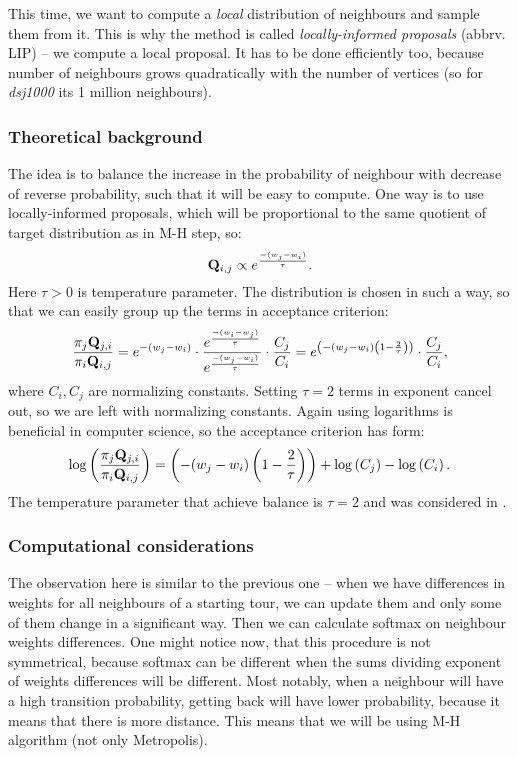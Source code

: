 	This time, we want to compute a \textit{local} distribution of neighbours and sample them from it. This is why the method is called \textit{locally-informed proposals} (abbrv. LIP) -- we compute a local proposal. It has to be done efficiently too, because number of neighbours grows quadratically with the number of vertices (so for \textit{dsj1000} its 1 million neighbours).
	
	\subsubsection{Theoretical background}
		The idea is to balance the increase in the probability of neighbour with decrease of reverse probability, such that it will be easy to compute. One way is to use locally-informed proposals, which will be proportional to the same quotient of target distribution as in M-H step, so:
		\begin{equation*}
			\mathbf{Q}_{i,j} \propto e^\frac{-(w_{j} - w_i)}{\tau}.
		\end{equation*}
		Here $\tau>0$ is temperature parameter. The distribution is chosen in such a way, so that we can easily group up the terms in acceptance criterion:
		\begin{equation*}
			\frac{\pi_j \mathbf{Q}_{j,i}}{\pi_i \mathbf{Q}_{i,j}} = e^{-(w_j-w_i)} \cdot \frac{e^\frac{-(w_{i} - w_j)}{\tau}}{e^\frac{-(w_{j} - w_i)}{\tau}} \cdot \frac{C_j}{C_i} = e^{\left( -(w_j-w_i) \left(1 - \frac{2}{\tau}\right) \right)} \cdot \frac{C_j}{C_i},
		\end{equation*}
		where $C_i, C_j$ are normalizing constants. Setting $\tau=2$ terms in exponent cancel out, so we are left with normalizing constants. Again using logarithms is beneficial in computer science, so the acceptance criterion has form:
		\begin{equation*}
			\log\left(\frac{\pi_j \mathbf{Q}_{j,i}}{\pi_i \mathbf{Q}_{i,j}}\right) = \left( -(w_j-w_i) \left(1 - \frac{2}{\tau}\right) \right) + \log\left(C_j\right) - \log\left(C_i\right).
		\end{equation*}
		The temperature parameter that achieve balance is $\tau=2$ and was considered in \cite{zanella2020informed}.
	
	\subsubsection{Computational considerations}
		The observation here is similar to the previous one -- when we have differences in weights for all neighbours of a starting tour, we can update them and only some of them change in a significant way. Then we can calculate softmax on neighbour weights differences. One might notice now, that this procedure is not symmetrical, because softmax can be different when the sums dividing exponent of weights differences will be different. Most notably, when a neighbour will have a high transition probability, getting back will have lower probability, because it means that there is more distance. This means that we will be using M-H algorithm (not only Metropolis).
		
